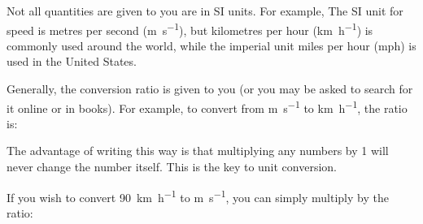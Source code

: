 Not all quantities are given to you are in SI units. For example, The SI unit
for speed is metres per second (\si{\metre\per\second}), but kilometres per
hour (\si{\kilo\metre\per\hour}) is commonly used around the world, while the
imperial unit miles per hour (\si{mph}) is used in the United States.

%
%
%
Generally, the conversion ratio is given to you (or you may be asked to search
for it online or in books). For example, to convert from
\si{\metre\per\second} to \si{\kilo\metre\per\hour}, the ratio is:
%
%
%

The advantage of writing this way is that multiplying any numbers by 1 will
never change the number itself. This is the key to unit conversion.

%
%
%
If you wish to convert \SI{90}{\kilo\metre\per\hour} to
\si{\metre\per\second}, you can simply multiply by the ratio:

%
%

